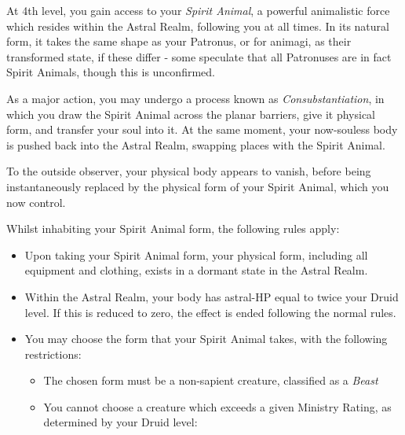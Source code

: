 {
	At 4th level, you gain access to your {\it Spirit Animal}, a powerful animalistic force which resides within the Astral Realm, following you at all times. In its natural form, it takes the same shape as your Patronus, or for animagi, as their transformed state, if these differ - some speculate that all Patronuses are in fact Spirit Animals, though this is unconfirmed. 
	
	As a major action, you may undergo a process known as {\it Consubstantiation}, in which you draw the Spirit Animal across the planar barriers, give it physical form, and transfer your soul into it. At the same moment, your now-souless body is pushed back into the Astral Realm, swapping places with the Spirit Animal. 

	To the outside observer, your physical body appears to vanish, before being instantaneously replaced by the physical form of your Spirit Animal, which you now control. 
	
	Whilst inhabiting your Spirit Animal form, the following rules apply:
	\begin{itemize}[itemsep = 0cm]
		\item Upon taking your Spirit Animal form, your physical form, including all equipment and clothing, exists in a dormant state in the Astral Realm. 
		\item Within the Astral Realm, your body has astral-HP equal to twice your Druid level. If this is reduced to zero, the effect is ended following the normal rules.
		\item You may choose the form that your Spirit Animal takes, with the following restrictions: 
			\begin{itemize}[itemsep = 0cm]
				\item The chosen form must be a non-sapient creature, classified as a {\it Beast}
				\item You cannot choose a creature which exceeds a given Ministry Rating, as determined by your Druid level:
					\begin{center}
						\newcommand\beastEntry[3]{#1	&	#2	&	{ #3} \\}
					

\end{center}
\end{itemize}
\end{itemize}}
